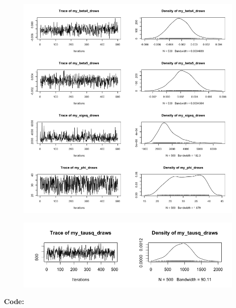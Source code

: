 \documentclass[12pt]{article}
\makeatletter
\theoremstyle{homework}
\newenvironment{exercise}[1]
{\def\@currentlabel{#1}\exercisecore}
{\endexercisecore}
\makeatother
\begin{document}
\begin{exercise}{3}
\begin{figure}[H]
  \end{figure}
  \begin{figure}[H]
    \begin{center}
    \includegraphics[width = \textwidth]{Rplot15.png}
    \end{center}
  \end{figure}
  \begin{figure}[H]
    \begin{center}
    \includegraphics[width = \textwidth]{Rplot16.png}
    \end{center}
  \end{figure}
  \textbf{Code:}
  \begin{center}
  
  \end{center}
  


\end{exercise}
\end{document}
